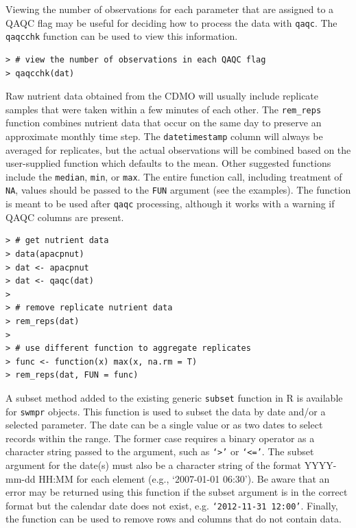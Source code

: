 \documentclass[10pt,letterpaper]{article}\usepackage[]{graphicx}\usepackage[]{color}
\makeatletter
\newenvironment{kframe}{%
 \def\at@end@of@kframe{}%
 \ifinner\ifhmode%
  \def\at@end@of@kframe{\end{minipage}}%
  \begin{minipage}{\columnwidth}%
 \fi\fi%
 \def\FrameCommand##1{\hskip\@totalleftmargin \hskip-\fboxsep
 \colorbox{shadecolor}{##1}\hskip-\fboxsep
     \hskip-\linewidth \hskip-\@totalleftmargin \hskip\columnwidth}%
 \MakeFramed {\advance\hsize-\width
   \@totalleftmargin\z@ \linewidth\hsize
   \@setminipage}}%
 {\par\unskip\endMakeFramed%
 \at@end@of@kframe}
\newenvironment{knitrout}{}{} %
\makeatother
\begin{document}
Viewing the number of observations for each parameter that are assigned to a \ac{QAQC} flag may be useful for deciding how to process the data with \texttt{qaqc}.  The \texttt{qaqcchk} function can be used to view this information.

\begin{knitrout}\small
{}\color{fgcolor}\begin{kframe}
\begin{verbatim}
> # view the number of observations in each QAQC flag
> qaqcchk(dat)
\end{verbatim}
\end{kframe}
\end{knitrout}

Raw nutrient data obtained from the \ac{CDMO} will usually include replicate samples that were taken within a few minutes of each other.  The \texttt{rem\_reps} function combines nutrient data that occur on the same day to preserve an approximate monthly time step.  The \texttt{datetimestamp} column will always be averaged for replicates, but the actual observations will be combined based on the user-supplied function which defaults to the mean.  Other suggested functions include the \texttt{median}, \texttt{min}, or \texttt{max}.  The entire function call, including treatment of \texttt{NA}, values should be passed to the \texttt{FUN} argument (see the examples).  The function is meant to be used after \texttt{qaqc} processing, although it works with a warning if \ac{QAQC} columns are present.

\begin{knitrout}\small
{}\color{fgcolor}\begin{kframe}
\begin{verbatim}
> # get nutrient data
> data(apacpnut)
> dat <- apacpnut
> dat <- qaqc(dat)
> 
> # remove replicate nutrient data
> rem_reps(dat)
> 
> # use different function to aggregate replicates
> func <- function(x) max(x, na.rm = T)
> rem_reps(dat, FUN = func)
\end{verbatim}
\end{kframe}
\end{knitrout}

A subset method added to the existing generic \texttt{subset} function in R is available for \texttt{swmpr} objects.  This function is used to subset the data by date and/or a selected parameter.  The date can be a single value or as two dates to select records within the range. The former case requires a binary operator as a character string passed to the argument, such as \texttt{`>'} or \texttt{`<='}.  The subset argument for the date(s) must also be a character string of the format YYYY-mm-dd HH:MM for each element (e.g., `2007-01-01 06:30').  Be aware that an error may be returned using this function if the subset argument is in the correct format but the calendar date does not exist, e.g. \texttt{`2012-11-31 12:00'}.  Finally, the function can be used to remove rows and columns that do not contain data. 
\end{document}
